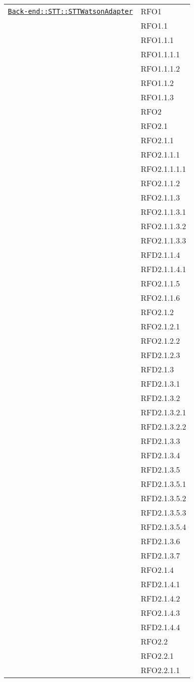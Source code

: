 \begin{longtable}{|>{\centering}m{10cm}|m{3cm}<{\centering}|}
\hyperref[Back-end::STT::STTWatsonAdapter]{\texttt{Back-end::STT::STTWatsonAdapter}} & RFO1\\
& RFO1.1\\
& RFO1.1.1\\
& RFO1.1.1.1\\
& RFO1.1.1.2\\
& RFO1.1.2\\
& RFO1.1.3\\
& RFO2\\
& RFO2.1\\
& RFO2.1.1\\
& RFO2.1.1.1\\
& RFO2.1.1.1.1\\
& RFO2.1.1.2\\
& RFO2.1.1.3\\
& RFO2.1.1.3.1\\
& RFO2.1.1.3.2\\
& RFO2.1.1.3.3\\
& RFD2.1.1.4\\
& RFD2.1.1.4.1\\
& RFO2.1.1.5\\
& RFO2.1.1.6\\
& RFO2.1.2\\
& RFO2.1.2.1\\
& RFO2.1.2.2\\
& RFD2.1.2.3\\
& RFD2.1.3\\
& RFD2.1.3.1\\
& RFD2.1.3.2\\
& RFD2.1.3.2.1\\
& RFD2.1.3.2.2\\
& RFD2.1.3.3\\
& RFD2.1.3.4\\
& RFD2.1.3.5\\
& RFD2.1.3.5.1\\
& RFD2.1.3.5.2\\
& RFD2.1.3.5.3\\
& RFD2.1.3.5.4\\
& RFD2.1.3.6\\
& RFD2.1.3.7\\
& RFO2.1.4\\
& RFD2.1.4.1\\
& RFD2.1.4.2\\
& RFO2.1.4.3\\
& RFD2.1.4.4\\
& RFO2.2\\
& RFO2.2.1\\
& RFO2.2.1.1\\

\end{longtable}
